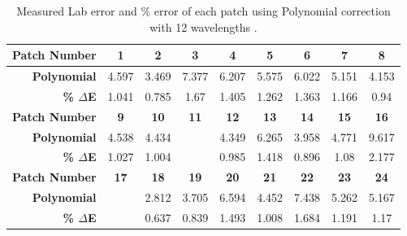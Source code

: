 \begin{table}[H]
  \caption{Measured Lab error and \% error of each patch using Polynomial correction with 12 wavelengths .}\n  \begin{center}
    \begin{tabularx}{\textwidth}{r c c c c c c c c}
    \toprule
        \textbf{Patch Number} & \textbf{1} & \textbf{2} & \textbf{3} & \textbf{4} & \textbf{5} & \textbf{6} & \textbf{7} & \textbf{8}\\ \midrule 
        \textbf{Polynomial} &4.597 &3.469 &7.377 &6.207 &5.575 &6.022 &5.151 &4.153\\ 
        \textbf{\textbf{\% $\Delta$E}} &1.041 &0.785 &1.67 &1.405 &1.262 &1.363 &1.166 &0.94\\ \midrule 
        \textbf{Patch Number} & \textbf{9} & \textbf{10} & \textbf{11} & \textbf{12} & \textbf{13} & \textbf{14} & \textbf{15} & \textbf{16}\\ \midrule 
        \textbf{Polynomial} &4.538 &4.434 &\cellcolor{colorred}{12.564} &4.349 &6.265 &3.958 &4.771 &9.617\\ 
        \textbf{\textbf{\% $\Delta$E}} &1.027 &1.004 &\cellcolor{colorred}{2.845} &0.985 &1.418 &0.896 &1.08 &2.177\\ \midrule 
        \textbf{Patch Number} & \textbf{17} & \textbf{18} & \textbf{19} & \textbf{20} & \textbf{21} & \textbf{22} & \textbf{23} & \textbf{24}\\ \midrule 
        \textbf{Polynomial} &\cellcolor{colorgreen}{2.576} &2.812 &3.705 &6.594 &4.452 &7.438 &5.262 &5.167\\ 
        \textbf{\textbf{\% $\Delta$E}} &\cellcolor{colorgreen}{0.583} &0.637 &0.839 &1.493 &1.008 &1.684 &1.191 &1.17\\ \midrule 
    \bottomrule
    \end{tabularx}
  \end{center}
\end{table}
